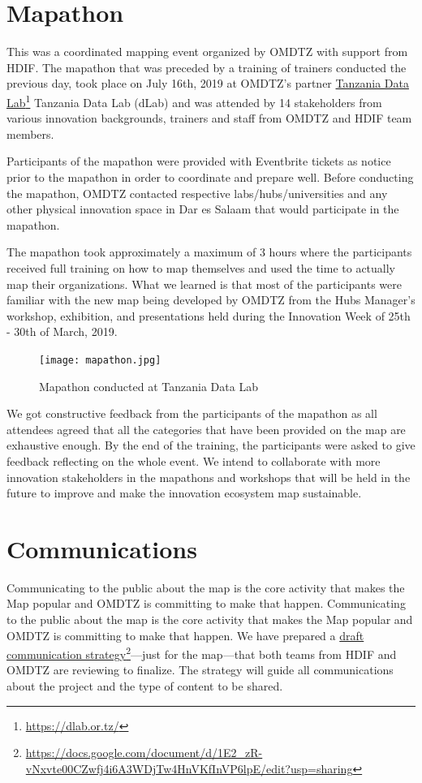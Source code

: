 \documentclass[a4paper,12pt,twoside]{article}
\begin{document}
\section{Mapathon}
This was a coordinated mapping event organized by OMDTZ with support from HDIF. The mapathon that was preceded by a training of trainers conducted the previous day, took place on July 16th, 2019 at OMDTZ’s partner \href{https://dlab.or.tz/}{Tanzania Data Lab}\footnote{\url{https://dlab.or.tz/}} Tanzania Data Lab (dLab) and was attended by 14 stakeholders from various innovation backgrounds, trainers and staff from OMDTZ and HDIF team members.

Participants of the mapathon were provided with Eventbrite tickets as notice prior to the mapathon in order to coordinate and prepare well. Before conducting the mapathon, OMDTZ contacted respective labs/hubs/universities and any other physical innovation space in Dar es Salaam that would participate in the mapathon.

The mapathon took approximately a maximum of 3 hours where the participants received full training on how to map themselves and used the time to actually map their organizations. What we learned is that most of the participants were familiar with the new map being developed by OMDTZ from the Hubs Manager’s workshop, exhibition, and presentations held during the Innovation Week of 25th - 30th of March, 2019.  

\begin{figure}%
	\centering
	\caption{Mapathon conducted at Tanzania Data Lab}
	\texttt{[image: mapathon.jpg]}
\end{figure}

We got constructive feedback from the participants of the mapathon as all attendees agreed that all the categories that have been provided on the map are exhaustive enough. By the end of the training, the participants were asked to give feedback reflecting on the whole event. We intend to collaborate with more innovation stakeholders in the mapathons and workshops that will be held in the future to improve and make the innovation ecosystem map sustainable.

\section{Communications}
Communicating to the public about the map is the core activity that makes the Map popular and OMDTZ is committing to make that happen. Communicating to the public about the map is the core activity that makes the Map popular and OMDTZ is committing to make that happen. We have prepared a \href{https://docs.google.com/document/d/1E2_zR-vNxvte00CZwfj4i6A3WDjTw4HnVKfInVP6lpE/edit?usp=sharing}{draft communication strategy}\footnote{\url{https://docs.google.com/document/d/1E2_zR-vNxvte00CZwfj4i6A3WDjTw4HnVKfInVP6lpE/edit?usp=sharing}}---just for the map---that both teams from HDIF and OMDTZ are reviewing to finalize. The strategy will guide all communications about the project and the type of content to be shared.
\end{document}
